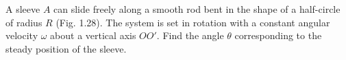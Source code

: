 \item A sleeve \( A \) can slide freely along a smooth rod bent in the shape of a half-circle of radius \( R \) (Fig. 1.28). The system is set in rotation with a constant angular velocity \( \omega \) about a vertical axis \( OO' \). Find the angle \( \theta \) corresponding to the steady position of the sleeve.
    \begin{center}
    \end{center}